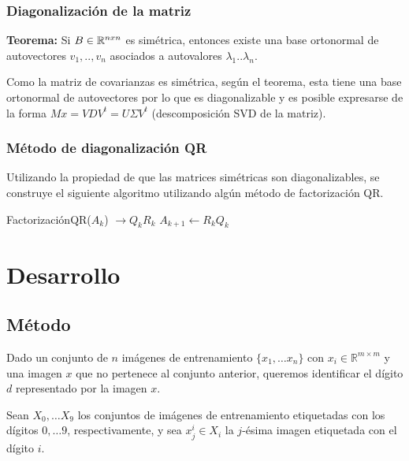 \documentclass[a4paper,10pt,twoside]{article}
\newcommand{\real}{\mathbb{R}}
\begin{document}
\subsubsection{Diagonalización de la matriz}
\textbf{Teorema:}
Si $\mathnormal{B} \in \mathbb{R}^{nxn}$ es simétrica, entonces existe una base ortonormal de autovectores ${v_1,..,v_n}$ asociados a autovalores $\lambda_1 .. \lambda_n$.

Como la matriz de covarianzas es simétrica, según el teorema, esta tiene una base ortonormal de autovectores por lo que es diagonalizable y es posible expresarse de la forma $Mx = VDV^{t} = U \Sigma V^{t}$ (descomposición SVD de la matriz).

\subsubsection{Método de diagonalización QR}
Utilizando la propiedad de que las matrices simétricas son diagonalizables, se construye el siguiente algoritmo utilizando algún método de factorización QR.

\begin{algorithmic}
    \STATE FactorizaciónQR($A_k$) $\rightarrow Q_k R_k$
    \STATE $A_{k+1} \leftarrow R_k Q_k$
  \ENDWHILE
\end{algorithmic}




\section{Desarrollo}


\subsection{Método}

Dado un conjunto de $n$ imágenes de entrenamiento $\{x_1, \ldots x_n\}$ con $x_i \in \real^{m \times m}$ y una imagen $x$ que no pertenece al conjunto anterior, queremos identificar el dígito $d$ representado por la imagen $x$.

Sean $X_0, \ldots X_9$ los conjuntos de imágenes de entrenamiento etiquetadas con los dígitos $0, \ldots 9$, respectivamente, y sea $x_j^i \in X_i$ la $j$-ésima imagen etiquetada con el dígito $i$.
\end{document}
